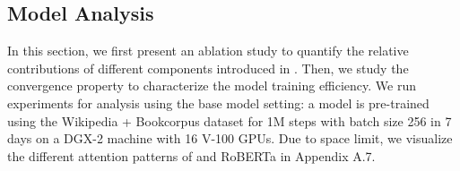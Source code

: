 \subsection{Model Analysis}
In this section, we first present an ablation study to quantify the relative contributions of different components introduced in {\ModelName}. 
Then, we study the convergence property to characterize the model training efficiency. 
We run experiments for analysis using the base model setting: a model is pre-trained using 
the Wikipedia + Bookcorpus dataset 
for 1M steps with batch size 256 
in 7 days on a DGX-2 machine with 16 V-100 GPUs.
Due to space limit, we visualize the different attention patterns of {\ModelName} and RoBERTa in Appendix A.7. 

